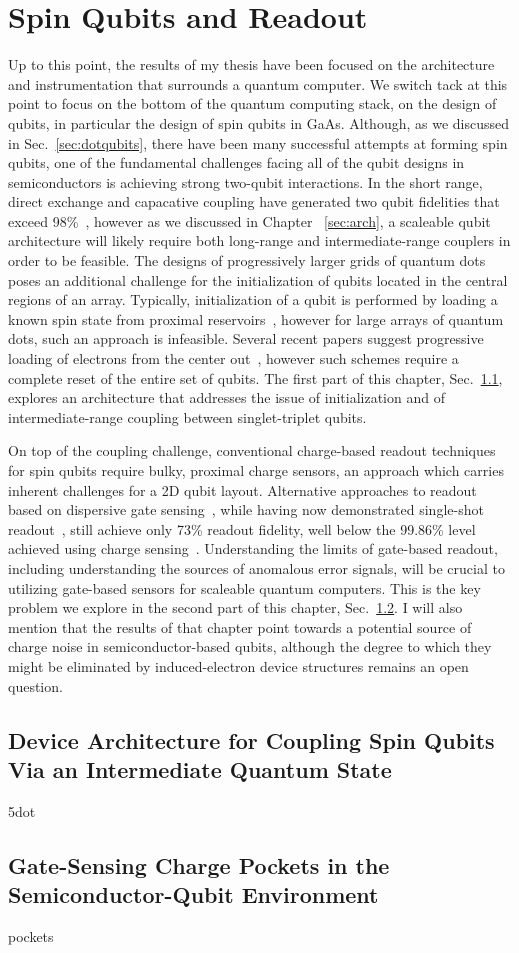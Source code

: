 \chapter{Spin Qubits and Readout}
\label{sec:spinqubit}

Up to this point, the results of my thesis have been focused on the architecture and instrumentation that surrounds a quantum
computer. We switch tack at this point to focus on the bottom of the quantum computing stack, on the design of qubits, in
particular the design of spin qubits in GaAs. Although, as we discussed in Sec.~\ref{sec:dotqubits}, there have been many
successful attempts at forming spin qubits, one of the fundamental challenges facing all of the qubit designs in semiconductors
is achieving strong two-qubit interactions. In the short range, direct exchange and capacative coupling have generated two qubit
fidelities that exceed 98\%~\cite{PhysRevA.99.042310}, however as we discussed in Chapter ~\ref{sec:arch}, a scaleable qubit architecture
will likely require both long-range and intermediate-range couplers in order to be feasible. The designs of progressively
larger grids of quantum dots poses an additional challenge for the initialization of qubits located in the central regions
of an array. Typically, initialization of a qubit is performed by loading a known spin state from proximal reservoirs~\cite{petta}, however
for large arrays of quantum dots, such an approach is infeasible. Several recent papers suggest progressive loading of electrons
from the center out~\cite{PhysRevApplied.6.054013,qubyte}, however such schemes require a complete reset of the entire set of qubits.
The first part of this chapter, Sec.~\ref{sec:5dot}, explores an architecture that addresses the issue of initialization and of
intermediate-range coupling between singlet-triplet qubits.

On top of the coupling challenge, conventional charge-based readout techniques for spin qubits require bulky, proximal charge sensors, an
approach which carries inherent challenges for a 2D qubit layout. Alternative approaches to readout based on dispersive gate
sensing~\cite{PhysRevLett.110.046805}, while having now demonstrated single-shot readout~\cite{Nnano_dzurak}, still achieve only 73\% readout
fidelity, well below the 99.86\% level achieved using charge sensing~\cite{Keith_2019,PhysRevX.8.021046}. Understanding the limits of gate-based
readout, including understanding the sources of anomalous error signals, will be crucial to utilizing gate-based sensors for scaleable quantum
computers. This is the key problem we explore in the second part of this chapter, Sec.~\ref{sec:pockets}. I will also mention that the results
of that chapter point towards a potential source of charge noise in semiconductor-based qubits, although the degree to which they might
be eliminated by induced-electron device structures remains an open question.

\clearpage
\section{Device Architecture for Coupling Spin Qubits Via an Intermediate Quantum State}
\label{sec:5dot}
{5dot}

\clearpage
\section{Gate-Sensing Charge Pockets in the Semiconductor-Qubit Environment}
\label{sec:pockets}
{pockets}